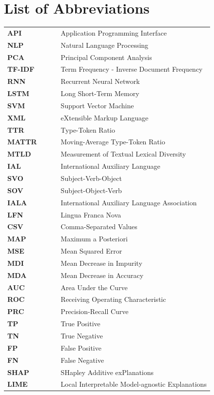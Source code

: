 \documentclass[12pt,a4paper]{article}
\numberwithin{figure}{section}
\numberwithin{table}{section}
\numberwithin{definition}{section}
\begin{document}
\section*{List of Abbreviations}

\begin{tabular}{lcl}
\textbf{API} & ~~~ & Application Programming Interface \\
\textbf{NLP} & ~~~ & Natural Language Processing \\
\textbf{PCA} & ~~~ & Principal Component Analysis \\
\textbf{TF-IDF} & ~~~ & Term Frequency - Inverse Document Frequency \\
\textbf{RNN} & ~~~ & Recurrent Neural Network \\
\textbf{LSTM} & ~~~ & Long Short-Term Memory \\
\textbf{SVM} & ~~~ & Support Vector Machine \\
\textbf{XML} & ~~~ & eXtensible Markup Language \\
\textbf{TTR} & ~~~ & Type-Token Ratio \\
\textbf{MATTR} & ~~~ & Moving-Average Type-Token Ratio \\
\textbf{MTLD} & ~~~ & Measurement of Textual Lexical Diversity \\
\textbf{IAL} & ~~~ & International Auxiliary Language \\
\textbf{SVO} & ~~~ & Subject-Verb-Object \\
\textbf{SOV} & ~~~ & Subject-Object-Verb \\
\textbf{IALA} & ~~~ & International Auxiliary Language Association \\
\textbf{LFN} & ~~~ & Lingua Franca Nova \\
\textbf{CSV} & ~~~ & Comma-Separated Values \\
\textbf{MAP} & ~~~ & Maximum a Posteriori \\
\textbf{MSE} & ~~~ & Mean Squared Error \\
\textbf{MDI} & ~~~ & Mean Decrease in Impurity \\
\textbf{MDA} & ~~~ & Mean Decrease in Accuracy \\
\textbf{AUC} & ~~~ & Area Under the Curve \\
\textbf{ROC} & ~~~ & Receiving Operating Characteristic \\
\textbf{PRC} & ~~~ & Precision-Recall Curve \\
\textbf{TP} & ~~~ & True Positive \\
\textbf{TN} & ~~~ & True Negative \\
\textbf{FP} & ~~~ & False Positive \\
\textbf{FN} & ~~~ & False Negative \\
\textbf{SHAP} & ~~~ & SHapley Additive exPlanations \\
\textbf{LIME} & ~~~ & Local Interpretable Model-agnostic Explanations \\


\end{tabular}
\newpage
\end{document}
